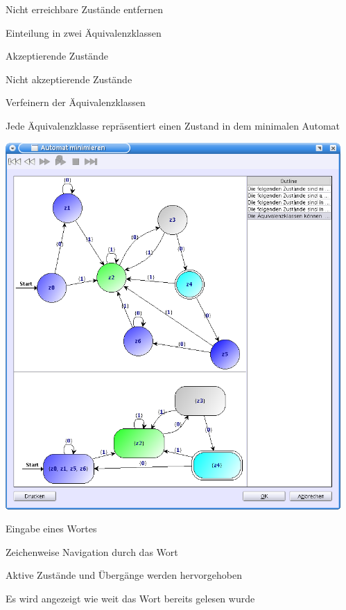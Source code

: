 {
    \begin{itemgroup}{}
	\item Nicht erreichbare Zustände entfernen
	\item Einteilung in zwei Äquivalenzklassen
		\begin{itemgroup}{}
		\item Akzeptierende Zustände
		\item Nicht akzeptierende Zustände
		\end{itemgroup}
	\item Verfeinern der Äquivalenzklassen
	\item Jede Äquivalenzklasse repräsentiert einen Zustand in dem minimalen
	Automat
	\end{itemgroup}
	
	\vfill{}    
}


{
  \begin{center}
    \includegraphics[height=14cm]{../images/minimize.png}
  \end{center}   
}


{
    \begin{itemgroup}{}
	\item Eingabe eines Wortes
	\item Zeichenweise Navigation durch das Wort
	\item Aktive Zustände und Übergänge werden hervorgehoben
	\item Es wird angezeigt wie weit das Wort bereits gelesen wurde
	\end{itemgroup}

	\vfill{}
}


